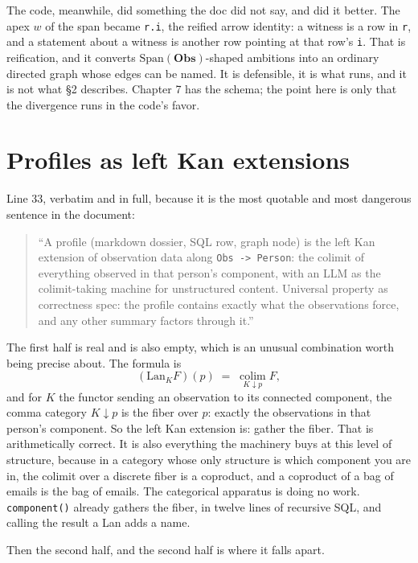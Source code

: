 The code, meanwhile, did something the doc did not say, and did it better. The apex $w$ of the span became \verb|r.i|, the reified arrow identity: a witness is a row in \verb|r|, and a statement about a witness is another row pointing at that row's \verb|i|. That is reification, and it converts $\mathrm{Span}(\mathbf{Obs})$-shaped ambitions into an ordinary directed graph whose edges can be named. It is defensible, it is what runs, and it is not what \S2 describes. Chapter 7 has the schema; the point here is only that the divergence runs in the code's favor.

\section{Profiles as left Kan extensions}

Line 33, verbatim and in full, because it is the most quotable and most dangerous sentence in the document:

\begin{quote}
``A profile (markdown dossier, SQL row, graph node) is the left Kan extension of observation data along \texttt{Obs -> Person}: the colimit of everything observed in that person's component, with an LLM as the colimit-taking machine for unstructured content. Universal property as correctness spec: the profile contains exactly what the observations force, and any other summary factors through it.''
\end{quote}

The first half is real and is also empty, which is an unusual combination worth being precise about. The formula is
\[
(\mathrm{Lan}_K F)(p) \;=\; \operatorname*{colim}_{K \downarrow p} F,
\]
and for $K$ the functor sending an observation to its connected component, the comma category $K \downarrow p$ is the fiber over $p$: exactly the observations in that person's component. So the left Kan extension is: gather the fiber. That is arithmetically correct. It is also everything the machinery buys at this level of structure, because in a category whose only structure is which component you are in, the colimit over a discrete fiber is a coproduct, and a coproduct of a bag of emails is the bag of emails. The categorical apparatus is doing no work. \verb|component()| already gathers the fiber, in twelve lines of recursive SQL, and calling the result a Lan adds a name.

Then the second half, and the second half is where it falls apart.

